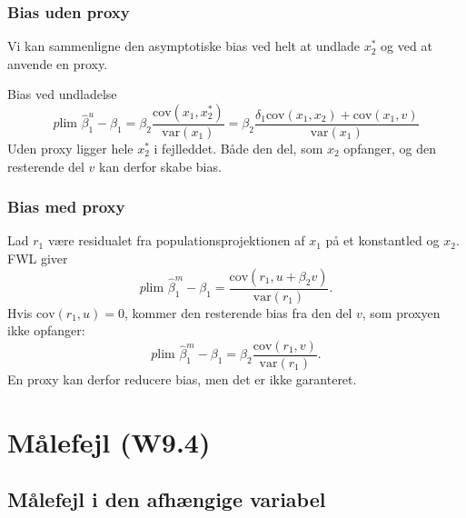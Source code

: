 \documentclass[aspectratio=43,t]{beamer}
\begin{document}

\begin{frame}
\frametitle{Bias uden proxy}
	
	Vi kan sammenligne den asymptotiske bias ved helt at undlade $x^*_2$ og ved at anvende en proxy.
	
	Bias ved undladelse
	\begin{equation*}
	p\text{lim } \hat{\beta}_1^{u} - \beta_1 
	= \beta_2 \frac{\text{cov}(x_1,x^*_2)}{\text{var}(x_1)} 
	= \beta_2 \frac{\delta_1\text{cov}(x_1, x_2)+\text{cov}(x_1,v)}{\text{var}(x_1)} 
	\end{equation*}	
	Uden proxy ligger hele $x_2^*$ i fejlleddet. Både den del, som $x_2$ opfanger, og den resterende del $v$ kan derfor skabe bias.

\end{frame}


\begin{frame}
\frametitle{Bias med proxy}

	Lad $r_1$ være residualet fra populationsprojektionen af $x_1$ på et konstantled og $x_2$. FWL giver
	\begin{equation*}
	p\text{lim } \hat{\beta}_1^{m} - \beta_1 
	= \frac{\text{cov}(r_1,u+\beta_2v)}{\text{var}(r_1)}.
	\end{equation*}		
	Hvis $\text{cov}(r_1,u)=0$, kommer den resterende bias fra den del $v$, som proxyen ikke opfanger:
	\begin{equation*}
	p\text{lim } \hat{\beta}_1^{m} - \beta_1
	=\beta_2\frac{\text{cov}(r_1,v)}{\text{var}(r_1)}.
	\end{equation*}
	En proxy kan derfor reducere bias, men det er ikke garanteret.
	
\end{frame}



\section[Målefejl]{Målefejl (W9.4)}

\subsection{Målefejl i den afhængige variabel}
\end{document}
